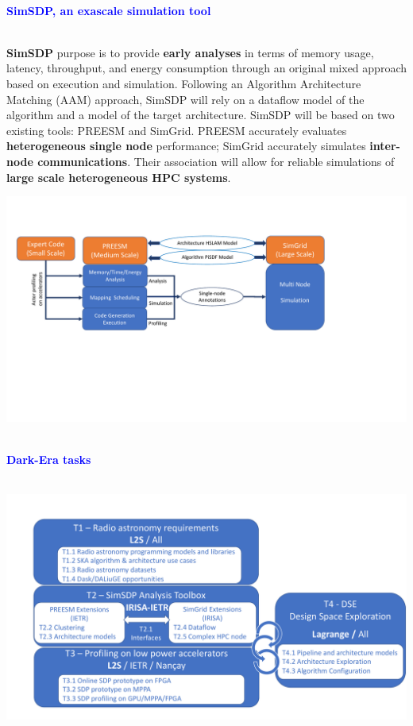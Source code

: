 \documentclass{beamer}
\renewenvironment{block}[1]{%
\begin{Sbox}%
\begin{minipage}[t]{\textwidth}
~\\
\textcolor{blue}{\quad #1}~\\
~\\%
\vspace{0.5cm}
} 
{%
\end{minipage}
\end{Sbox}\Ovalbox{\TheSbox}%
}
\begin{document}
{\begin{columns}[t]
\begin{column}{.49\linewidth}
\begin{block}{\large \textbf{SimSDP, an exascale simulation tool}}
 \begin{minipage}{0.95\textwidth}
 \textbf{SimSDP} purpose is to provide \textbf{early analyses} in terms of memory usage, latency, throughput, and energy consumption through an original mixed approach based on execution and simulation. Following an Algorithm Architecture Matching (AAM) approach, SimSDP will rely on a dataflow model of the algorithm and a model of the target architecture. SimSDP will be based on two existing tools: PREESM and SimGrid. PREESM accurately evaluates \textbf{heterogeneous single node} performance; SimGrid accurately simulates \textbf{inter-node communications}. Their association will allow for reliable simulations of \textbf{large scale heterogeneous HPC systems}.
 \\
 \begin{center}
    \includegraphics[width=\textwidth ]{SimSDP_overview} %
    \end{center}
 \end{minipage}
\end{block}

\begin{block}{\large \textbf{Dark-Era tasks}}
        \begin{minipage}{0.95\textwidth}
 \begin{center}
    \includegraphics[width=\textwidth ]{Tasks} %
    \end{center}
    

\end{minipage}
\end{block}
\end{column}
\end{columns}}
\end{document}
